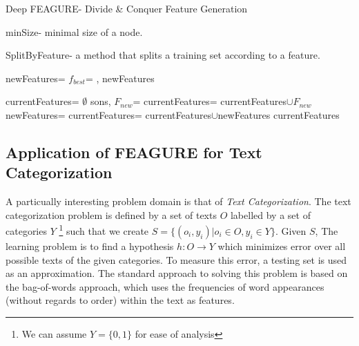 \documentclass[twoside,11pt]{article}
\theoremstyle{definition}
\begin{document}
\begin{algorithm}[H]
	\caption{Deep FEAGURE- Divide \& Conquer Feature Generation}
	\label{code-tree-thing}
	\small
		minSize- minimal size of a node.

        SplitByFeature- a method that splits a training set according to a feature.
        
		\begin{algorithmic}
                    \State
                    \Return 
                \EndIf
                \State newFeatures=
                \State $f_{best}$=
                \State \Return {}, newFeatures
			\EndFunction

            			
			\State 
                \State currentFeatures= $\emptyset$
                \State sons, $F_{new}$=
                \State currentFeatures= currentFeatures$\cup F_{new}$
                    \State newFeatures=
                    \State currentFeatures= currentFeatures$\cup$newFeatures
                \EndFor
                \State \Return currentFeatures
			\EndFunction
		\end{algorithmic}
	\end{algorithm}

\subsection{Application of FEAGURE for Text Categorization}

A particually interesting problem domain is that of \emph{Text Categorization}.
The text categorization problem is defined by a set of texts $O$ labelled by a set of categories $Y$ \footnote{We can assume $Y=\{0,1\}$ for ease of analysis}
 such that we create $S=\{(o_i,y_i)|o_i\in O, y_i\in Y\}$. Given $S$, The learning problem is to find a hypothesis $h:O\rightarrow Y$ which minimizes error over all possible texts of the given categories. To measure this error, a testing set is used as an approximation.
The standard approach to solving this problem is based on the bag-of-words \cite{Wu:1981:CST:1013228.511759,salton1983introduction} approach, which uses the frequencies of word appearances (without regards to order) within the text as features. 
\end{document}

